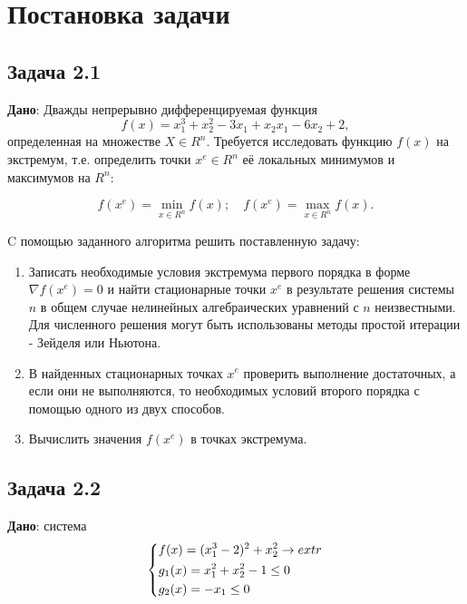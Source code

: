 \documentclass[a4paper, 12pt]{article}   	%
\begin{document}
\newpage

\section{Постановка задачи}
\subsection{Задача 2.1}
    \textbf {Дано}: Дважды непрерывно дифференцируемая функция 
    \begin{equation}
        f(x) = x^3_1 + x^2_2 - 3x_1 + x_2 x_1 - 6x_2 + 2,
    \end{equation}
    определенная на множестве $X \in R^n$. Требуется исследовать функцию  $f(x)$ на экстремум, т.е. определить точки $x^e \in R^n$ её локальных минимумов и максимумов на $R^n$:
    
    \begin{equation}
        f(x^e) = \min_{x \in R^n} f(x); \quad f(x^e) = \max_{x \in R^n} f(x).
    \end{equation}
    
    C помощью заданного алгоритма решить поставленную задачу:
    \begin{enumerate}
        \item Записать необходимые условия экстремума первого порядка в форме $\nabla f(x^e) = 0$ и найти стационарные точки $x^e$ в результате решения системы $n$ в общем случае нелинейных алгебраических уравнений с $n$ неизвестными. Для численного решения могут быть использованы методы простой итерации - Зейделя или Ньютона.
        \item В найденных стационарных точках $x^e$ проверить выполнение достаточных, а если они не выполняются, то необходимых условий второго порядка с помощью одного из двух способов.
        \item Вычислить значения $f(x^e)$ в точках экстремума.
    \end{enumerate} 
    
\subsection{Задача 2.2}
    \textbf {Дано}: система
    \begin{equation}
        \begin{dcases*}
            f(x) = (x^3_1 - 2)^2 + x^2_2 \rightarrow extr\\
            g_1(x) = x^2_1 + x^2_2 - 1 \leq 0 \\
            g_2(x) = -x_1 \leq 0
        \end{dcases*}
    \end{equation}
    
\end{document}
